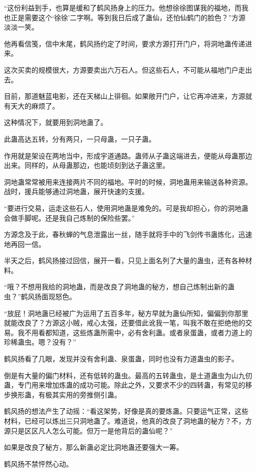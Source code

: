 \begin{this_body}
“这份利益到手，也算是缓和了鹤风扬身上的压力。他想徐徐图谋我的福地，而我也正是需要这个‘徐徐’二字啊。等到我日后成了蛊仙，还怕仙鹤门的脸色？”方源淡淡一笑。

他再看信笺，信中末尾，鹤风扬约定了时间，要求方源打开门户，将洞地蛊传递进来。

这次买卖的规模很大，方源要卖出六万石人。但这些石人，不可能从福地门户走出去。

目前，那道魅蓝电影，还在天梯山上徘徊。如果敞开门户，让它再冲进来，方源就有天大的麻烦了。

这种情况下，就要用到洞地蛊了。

此蛊高达五转，分有两只，一只母蛊，一只子蛊。

作用就是架设在两地当中，形成宇道通路。蛊师从子蛊这端进去，便能从母蛊那边出来。同样的，从母蛊那边，也能顷刻到达子蛊这里。

洞地蛊常常被用来连接两片不同的福地。平时的时候，洞地蛊用来输送各种资源。战时，援兵能够通过洞地蛊，展开快速的支援。

“要进行交易，运走这些石人，使用洞地蛊是难免的。可是我却担心，你的洞地蛊会做手脚呢。还是我自己炼制的保险些罢。”

方源念及于此，春秋蝉的气息泄露出一丝，随手就将手中的飞剑传书蛊炼化，迅速地再回一信。

半天之后，鹤风扬接过回信，展开一看，只见上面名列了大量的蛊虫，还有各种材料。

“哦？不想用我给的洞地蛊，而是改良了洞地蛊的秘方，想自己炼制出新的蛊虫？”鹤风扬面现怒色。

“放屁！洞地蛊已经被广为运用了五百多年，秘方早就为蛊仙所知，偏偏到你那里就能改良了？方源这小贼，戒心太强，还要借此讹我一笔，叫我不敢在拒绝他的交易。我不用看都知道，这些炼蛊所需中，必有舍利蛊。或者泉蛋蛊，或者力道上的珍稀蛊虫。嗯？没有？”

鹤风扬看了几眼，发现并没有舍利蛊、泉蛋蛊，同时也没有力道蛊虫的影子。

倒是有大量的偏门材料，还有低转的蛊虫。最高的五转蛊虫，是土道蛊虫为山九仞蛊，专门用来增加炼蛊的成功可能。除此之外，又要求不少的四转蛊，有常见的移步换形蛊，有极其实用的旁推侧引蛊。

鹤风扬的想法产生了动摇：“看这架势，好像是真的要炼蛊。只要运气正常，这些材料，已经可以炼出三只洞地蛊了。难道说，他真的改良了洞地蛊的秘方？不，方源只是区区凡人怎么可能。但万一是他背后的蛊仙呢？”

如果是改良了秘方，那么新蛊必定比洞地蛊还要强大一筹。

鹤风扬不禁怦然心动。


\end{this_body}
